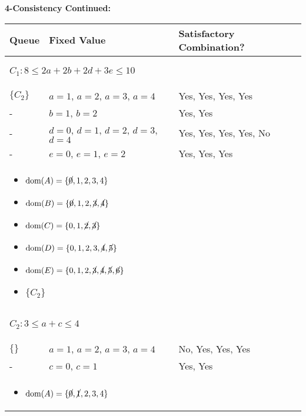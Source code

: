 \begin{example} \textbf{4-Consistency Continued:}
    \begin{center}
        \begin{tabular}{lll}
            \textbf{Queue} & \textbf{Fixed Value} & \textbf{Satisfactory Combination?} \\
            \toprule
            \multicolumn{3}{p{\linewidth}}{
            \begin{center}
                $C_1: 8 \leq 2a + 2b + 2d + 3e \leq 10$
            \end{center}} \\
            $\{C_2\}$ & $a=1$, $a=2$, $a=3$, $a=4$ & Yes, Yes, Yes, Yes \\
            - & $b=1$, $b=2$ & Yes, Yes \\
            - & $d=0$, $d=1$, $d=2$, $d=3$, $d=4$ & Yes, Yes, Yes, Yes, No \\
            - & $e=0$, $e=1$, $e=2$ & Yes, Yes, Yes \\
            \multicolumn{3}{p{\linewidth}}{
            \begin{itemize}
                \item $\text{dom}(A) = \{\cancel{0}, 1, 2, 3, 4\}$
                \item $\text{dom}(B) = \{\cancel{0}, 1, 2, \cancel{3}, \cancel{4}\} $
                \item $\text{dom}(C) = \{0, 1, \cancel{2}, \cancel{3}\} $
                \item $\text{dom}(D) = \{0, 1, 2, 3, \cancel{4}, \cancel{5}\} $
                \item $\text{dom}(E) = \{0, 1, 2, \cancel{3}, \cancel{4}, \cancel{5}, \cancel{6}\} $
                \item $\{C_2\}$
            \end{itemize}} \\
            \midrule
            \multicolumn{3}{p{\linewidth}}{
            \begin{center}
                $C_2: 3 \leq a + c \leq 4$
            \end{center}} \\
            $\{\}$ & $a=1$, $a=2$, $a=3$, $a=4$ & No, Yes, Yes, Yes \\
            - & $c=0$, $c=1$ & Yes, Yes \\
            \multicolumn{3}{p{\linewidth}}{
            \begin{itemize}
                \item $\text{dom}(A) = \{\cancel{0}, \cancel{1}, 2, 3, 4\}$

\end{itemize}}
\end{tabular}
\end{center}
\end{example}
